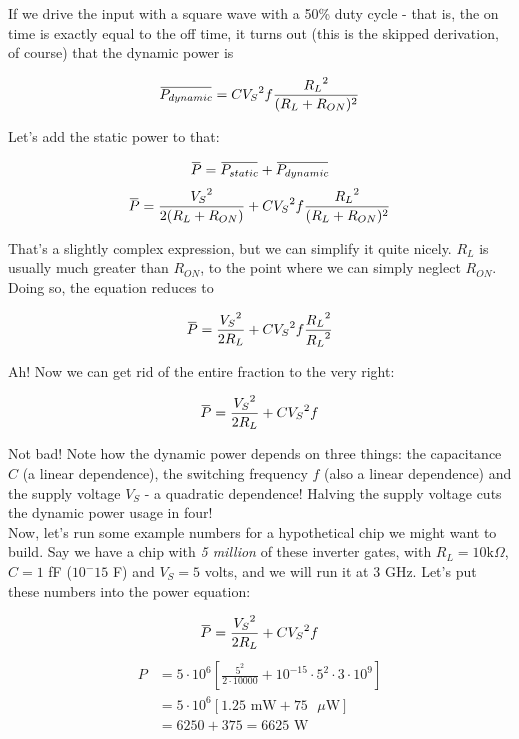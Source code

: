 \documentclass[12pt,a4paper]{report}
\newcommand{\overbar}[1]{\mkern 1.5mu\overline{\mkern-1.5mu#1\mkern-1.5mu}\mkern 1.5mu}
\begin{document}
If we drive the input with a square wave with a 50\% duty cycle - that is, the on time is exactly equal to the off time, it turns out (this is the skipped derivation, of course) that the dynamic power is

\[ \overbar{P_{dynamic}} = C {V_S}^2 f \frac{{R_L}^2}{(R_L + R_{ON})^2} \]

Let's add the static power to that:

\[ \overbar{P} = \overbar{P_{static}} + \overbar{P_{dynamic}} \]
\[ \overbar{P} = \frac{{V_S}^2}{2(R_L + R_{ON})} + C {V_S}^2 f \frac{{R_L}^2}{(R_L + R_{ON})^2} \]

That's a slightly complex expression, but we can simplify it quite nicely. $R_L$ is usually much greater than $R_{ON}$, to the point where we can simply neglect $R_{ON}$. Doing so, the equation reduces to

\[ \overbar{P} = \frac{{V_S}^2}{2R_L} + C {V_S}^2 f \frac{{R_L}^2}{{R_L}^2} \]

Ah! Now we can get rid of the entire fraction to the very right:

\[ \overbar{P} = \frac{{V_S}^2}{2R_L} + C {V_S}^2 f \]

Not bad! Note how the dynamic power depends on three things: the capacitance $C$ (a linear dependence), the switching frequency $f$ (also a linear dependence) and the supply voltage $V_S$ - a quadratic dependence! Halving the supply voltage cuts the dynamic power usage in four!\\

Now, let's run some example numbers for a hypothetical chip we might want to build. Say we have a chip with \emph{5 million} of these inverter gates, with $R_L = 10\text{k} \Omega$, $C = 1$ fF ($10^-15$ F) and $V_S = 5$ volts, and we will run it at 3 GHz. Let's put these numbers into the power equation:

\[ \overbar{P} = \frac{{V_S}^2}{2R_L} + C {V_S}^2 f \]
\begin{align*}
  P &= 5\cdot 10^6 \left[ \frac{5^2}{2 \cdot 10000} + 10^{-15} \cdot {5}^2 \cdot 3 \cdot 10^9 \right] \\
    &= 5\cdot 10^6 \left[ 1.25 \text{ mW} + 75 \text { } \mu \text{W} \right] \\
    &= 6250 + 375 = 6625 \text { W}
\end{align*}
\end{document}
